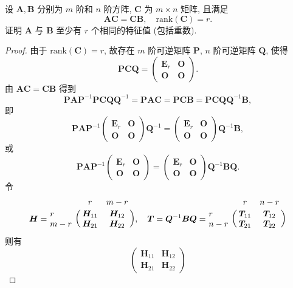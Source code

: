 \documentclass[../../main.tex]{subfiles}%
\begin{document}
\begin{example}
设 $\boldsymbol{A},\boldsymbol{B}$ 分别为 $m$ 阶和 $n$ 阶方阵, $\boldsymbol{C}$ 为 $m \times n$ 矩阵, 且满足
\[
\boldsymbol{AC} = \boldsymbol{CB}, \quad \mathrm{rank}(\boldsymbol{C}) = r.
\]
证明 $\boldsymbol{A}$ 与 $\boldsymbol{B}$ 至少有 $r$ 个相同的特征值 (包括重数).
\end{example}
\begin{proof}

由于 $\mathrm{rank}(\boldsymbol{C}) = r$, 故存在 $m$ 阶可逆矩阵 $\boldsymbol{P}$, $n$ 阶可逆矩阵 $\boldsymbol{Q}$, 使得
\[
\boldsymbol{PCQ} = \begin{pmatrix} 
\boldsymbol{E}_r & \boldsymbol{O} \\
\boldsymbol{O} & \boldsymbol{O} 
\end{pmatrix}.
\]
由 $\boldsymbol{AC} = \boldsymbol{CB}$ 得到
\[
\boldsymbol{PAP}^{-1}\boldsymbol{PCQQ}^{-1} = \boldsymbol{PAC} = \boldsymbol{PCB} = \boldsymbol{PCQQ}^{-1}\boldsymbol{B},
\]
即
\[
\boldsymbol{PAP}^{-1} \begin{pmatrix} 
\boldsymbol{E}_r & \boldsymbol{O} \\
\boldsymbol{O} & \boldsymbol{O} 
\end{pmatrix} \boldsymbol{Q}^{-1} = \begin{pmatrix} 
\boldsymbol{E}_r & \boldsymbol{O} \\
\boldsymbol{O} & \boldsymbol{O} 
\end{pmatrix} \boldsymbol{Q}^{-1}\boldsymbol{B},
\]
或
\[
\boldsymbol{PAP}^{-1} \begin{pmatrix} 
\boldsymbol{E}_r & \boldsymbol{O} \\
\boldsymbol{O} & \boldsymbol{O} 
\end{pmatrix} = \begin{pmatrix} 
\boldsymbol{E}_r & \boldsymbol{O} \\
\boldsymbol{O} & \boldsymbol{O} 
\end{pmatrix} \boldsymbol{Q}^{-1}\boldsymbol{BQ}.
\]
令
\[
\boldsymbol{H} = \bordermatrix{%
& r & m-r \cr
r & \boldsymbol{H}_{11}& \boldsymbol{H}_{12}  \cr
m-r & \boldsymbol{H}_{21}& \boldsymbol{H}_{22}  \cr
}, \quad \boldsymbol{T} = \boldsymbol{Q}^{-1}\boldsymbol{BQ} = \bordermatrix{%
& r & n-r \cr
r & \boldsymbol{T}_{11}& \boldsymbol{T}_{12}  \cr
n-r & \boldsymbol{T}_{21}& \boldsymbol{T}_{22}  \cr
}
\]
则有
\[
\begin{pmatrix} 
\boldsymbol{H}_{11} & \boldsymbol{H}_{12} \\
\boldsymbol{H}_{21} & \boldsymbol{H}_{22} 

\end{pmatrix}\]
\end{proof}
\end{document}
